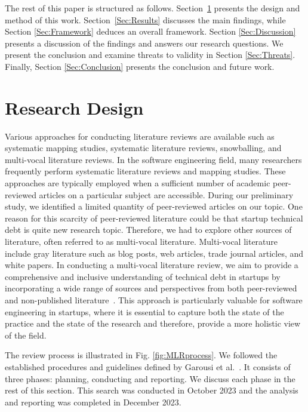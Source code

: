 The rest of this paper is structured as follows.
Section~\ref{Sec:Research} presents the design and method of this work.
Section~\ref{Sec:Results} discusses the main findings, while Section \ref{Sec:Framework} deduces an overall framework. Section \ref{Sec:Discussion} presents a discussion of the findings and answers our research questions.
We present the conclusion and examine threats to validity in Section \ref{Sec:Threats}.
Finally, Section \ref{Sec:Conclusion} presents the conclusion and future work.

\section{Research Design}\label{Sec:Research}
Various approaches for conducting literature reviews are available such as systematic mapping studies, systematic literature reviews, snowballing, and multi-vocal literature reviews.
In the software engineering field, many researchers frequently perform systematic literature reviews and mapping studies.
These approaches are typically employed when a sufficient number of academic peer-reviewed articles on a particular subject are accessible.
During our preliminary study, we identified a limited quantity of peer-reviewed articles on our topic.
One reason for this scarcity of peer-reviewed literature could be that startup technical debt is quite new research topic.
Therefore, we had to explore other sources of literature, often referred to as multi-vocal literature.
Multi-vocal literature include gray literature such as blog posts, web articles, trade journal articles, and white papers.
In conducting a multi-vocal literature review, we aim to provide a comprehensive and inclusive understanding of technical debt in startups by incorporating a wide range of sources and perspectives from both peer-reviewed and non-published literature~\cite{Ogawa91, Garousi2016/2915970.2916008}.
This approach is particularly valuable for software engineering in startups, where it is essential to capture both the state of the practice and the state of the research and therefore, provide a more holistic view of the field. 

The review process is illustrated in Fig. \ref{fig:MLRprocess}.
We followed the established procedures and guidelines defined by Garousi et al.~\cite{GAROUSI2019101}.
It consists of three phases: planning, conducting and reporting.
We discuss each phase in the rest of this section.
This search was conducted in October 2023 and the analysis and reporting was completed in December 2023.

